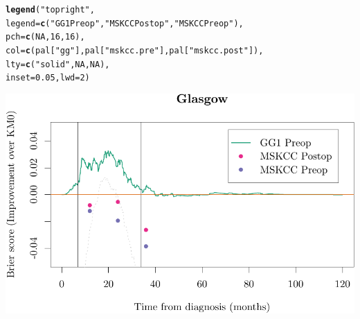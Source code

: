 \documentclass{article}\usepackage[]{graphicx}\usepackage[]{color}
\makeatletter
\def\maxwidth{ %
  \ifdim\Gin@nat@width>\linewidth
    \linewidth
  \else
    \Gin@nat@width
  \fi
}
\newcommand{\hlnum}[1]{\textcolor[rgb]{0.686,0.059,0.569}{#1}}%
\newcommand{\hlstr}[1]{\textcolor[rgb]{0.192,0.494,0.8}{#1}}%
\newcommand{\hlstd}[1]{\textcolor[rgb]{0.345,0.345,0.345}{#1}}%
\newcommand{\hlkwc}[1]{\textcolor[rgb]{0.333,0.667,0.333}{#1}}%
\newcommand{\hlkwd}[1]{\textcolor[rgb]{0.737,0.353,0.396}{\textbf{#1}}}%
\newenvironment{kframe}{%
 \def\at@end@of@kframe{}%
 \ifinner\ifhmode%
  \def\at@end@of@kframe{\end{minipage}}%
  \begin{minipage}{\columnwidth}%
 \fi\fi%
 \def\FrameCommand##1{\hskip\@totalleftmargin \hskip-\fboxsep
 \colorbox{shadecolor}{##1}\hskip-\fboxsep
     \hskip-\linewidth \hskip-\@totalleftmargin \hskip\columnwidth}%
 \MakeFramed {\advance\hsize-\width
   \@totalleftmargin\z@ \linewidth\hsize
   \@setminipage}}%
 {\par\unskip\endMakeFramed%
 \at@end@of@kframe}
\newenvironment{knitrout}{}{} %
\makeatother
\begin{document}
\begin{knitrout}
\begin{kframe}
\begin{alltt}
\hlkwd{legend}\hlstd{(}\hlstr{"topright"}\hlstd{,}
        \hlkwc{legend} \hlstd{=} \hlkwd{c}\hlstd{(}     \hlstr{"GG1 Preop"}\hlstd{,}    \hlstr{"MSKCC Postop"}\hlstd{,}         \hlstr{"MSKCC Preop"}\hlstd{),}
        \hlkwc{pch} \hlstd{=} \hlkwd{c}\hlstd{(}        \hlnum{NA}\hlstd{,}                     \hlnum{16}\hlstd{,}                             \hlnum{16}\hlstd{),}
        \hlkwc{col} \hlstd{=} \hlkwd{c}\hlstd{(        pal[}\hlstr{"gg"}\hlstd{],              pal[}\hlstr{"mskcc.pre"}\hlstd{],       pal[}\hlstr{"mskcc.post"}\hlstd{]),}
        \hlkwc{lty} \hlstd{=} \hlkwd{c}\hlstd{(}        \hlstr{"solid"}\hlstd{,}                \hlnum{NA}\hlstd{,}                             \hlnum{NA}\hlstd{),}
        \hlkwc{inset} \hlstd{=} \hlnum{0.05}\hlstd{,} \hlkwc{lwd} \hlstd{=} \hlnum{2}\hlstd{)}
\end{alltt}
\end{kframe}

{\centering \includegraphics[width=\maxwidth]{figure/07-prob-bs-paths-plot-glasgow-3} 

}



\end{knitrout}
\end{document}
